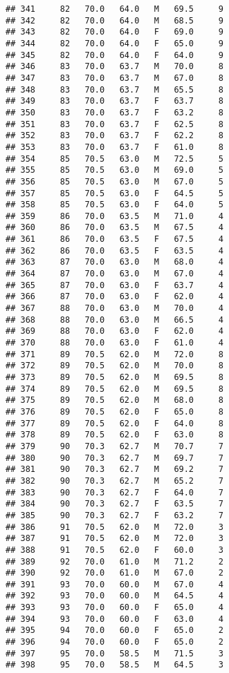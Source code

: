 \documentclass[
]{article}
\begin{document}
\begin{verbatim}
## 341     82   70.0   64.0   M   69.5     9
## 342     82   70.0   64.0   M   68.5     9
## 343     82   70.0   64.0   F   69.0     9
## 344     82   70.0   64.0   F   65.0     9
## 345     82   70.0   64.0   F   64.0     9
## 346     83   70.0   63.7   M   70.0     8
## 347     83   70.0   63.7   M   67.0     8
## 348     83   70.0   63.7   M   65.5     8
## 349     83   70.0   63.7   F   63.7     8
## 350     83   70.0   63.7   F   63.2     8
## 351     83   70.0   63.7   F   62.5     8
## 352     83   70.0   63.7   F   62.2     8
## 353     83   70.0   63.7   F   61.0     8
## 354     85   70.5   63.0   M   72.5     5
## 355     85   70.5   63.0   M   69.0     5
## 356     85   70.5   63.0   M   67.0     5
## 357     85   70.5   63.0   F   64.5     5
## 358     85   70.5   63.0   F   64.0     5
## 359     86   70.0   63.5   M   71.0     4
## 360     86   70.0   63.5   M   67.5     4
## 361     86   70.0   63.5   F   67.5     4
## 362     86   70.0   63.5   F   63.5     4
## 363     87   70.0   63.0   M   68.0     4
## 364     87   70.0   63.0   M   67.0     4
## 365     87   70.0   63.0   F   63.7     4
## 366     87   70.0   63.0   F   62.0     4
## 367     88   70.0   63.0   M   70.0     4
## 368     88   70.0   63.0   M   66.5     4
## 369     88   70.0   63.0   F   62.0     4
## 370     88   70.0   63.0   F   61.0     4
## 371     89   70.5   62.0   M   72.0     8
## 372     89   70.5   62.0   M   70.0     8
## 373     89   70.5   62.0   M   69.5     8
## 374     89   70.5   62.0   M   69.5     8
## 375     89   70.5   62.0   M   68.0     8
## 376     89   70.5   62.0   F   65.0     8
## 377     89   70.5   62.0   F   64.0     8
## 378     89   70.5   62.0   F   63.0     8
## 379     90   70.3   62.7   M   70.7     7
## 380     90   70.3   62.7   M   69.7     7
## 381     90   70.3   62.7   M   69.2     7
## 382     90   70.3   62.7   M   65.2     7
## 383     90   70.3   62.7   F   64.0     7
## 384     90   70.3   62.7   F   63.5     7
## 385     90   70.3   62.7   F   63.2     7
## 386     91   70.5   62.0   M   72.0     3
## 387     91   70.5   62.0   M   72.0     3
## 388     91   70.5   62.0   F   60.0     3
## 389     92   70.0   61.0   M   71.2     2
## 390     92   70.0   61.0   M   67.0     2
## 391     93   70.0   60.0   M   67.0     4
## 392     93   70.0   60.0   M   64.5     4
## 393     93   70.0   60.0   F   65.0     4
## 394     93   70.0   60.0   F   63.0     4
## 395     94   70.0   60.0   F   65.0     2
## 396     94   70.0   60.0   F   65.0     2
## 397     95   70.0   58.5   M   71.5     3
## 398     95   70.0   58.5   M   64.5     3

\end{verbatim}
\end{document}
